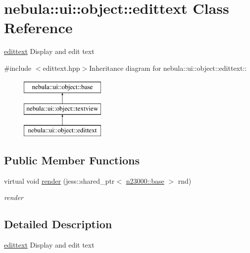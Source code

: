 \hypertarget{classnebula_1_1ui_1_1object_1_1edittext}{
\section{nebula::ui::object::edittext Class Reference}
\label{classnebula_1_1ui_1_1object_1_1edittext}
}


\hyperlink{classnebula_1_1ui_1_1object_1_1edittext}{edittext} Display and edit text  


{\ttfamily \#include $<$edittext.hpp$>$}Inheritance diagram for nebula::ui::object::edittext::\begin{figure}[H]
\begin{center}
\leavevmode
\includegraphics[height=3cm]{classnebula_1_1ui_1_1object_1_1edittext}
\end{center}
\end{figure}
\subsection*{Public Member Functions}
\begin{DoxyCompactItemize}
\item 
virtual void \hyperlink{classnebula_1_1ui_1_1object_1_1edittext_a824a31e2e8f8407a4cfb413b877c726c}{render} (jess::shared\_\-ptr$<$ \hyperlink{classnebula_1_1platform_1_1renderer_1_1base}{n23000::base} $>$ rnd)
\begin{DoxyCompactList}\small\item\em render \item\end{DoxyCompactList}\end{DoxyCompactItemize}


\subsection{Detailed Description}
\hyperlink{classnebula_1_1ui_1_1object_1_1edittext}{edittext} Display and edit text 

